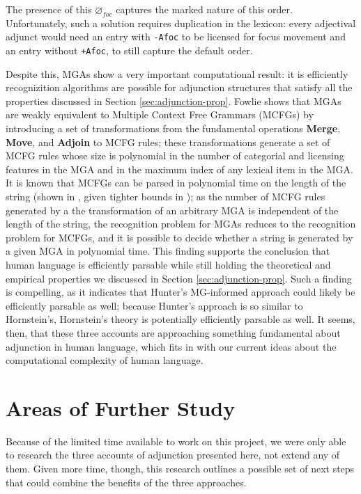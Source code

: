 \documentclass{article}
\begin{document}
The presence of this $\varnothing_{foc}$ captures the marked nature of
this order.  Unfortunately, such a solution requires duplication in
the lexicon: every adjectival adjunct would need an entry with
\texttt{-Afoc} to be licensed for focus movement and an entry without
\texttt{+Afoc}, to still capture the default order.

Despite this, MGAs show a very important computational result: it is
efficiently recognizition algorithms are possible for adjunction
structures that satisfy all the properties discussed in Section
\ref{sec:adjunction-prop}.  Fowlie shows that MGAs are weakly
equivalent to Multiple Context Free Grammars (MCFGs) \cite[Lemma
7.8.4]{fowlie2015} by introducing a set of transformations from the
fundamental operations \textbf{Merge}, \textbf{Move}, and
\textbf{Adjoin} to MCFG rules; these transformations generate a set of
MCFG rules whose size is polynomial in the number of categorial and
licensing features in the MGA and in the maximum index of any lexical
item in the MGA.  It is known that MCFGs can be parsed in polynomial
time on the length of the string (shown in \cite[Theorem
3.10]{seki1991}, given tighter bounds in \cite{nakanishi1997}); as the
number of MCFG rules generated by a the transformation of an arbitrary
MGA is independent of the length of the string, the recognition
problem for MGAs reduces to the recognition problem for MCFGs, and it
is possible to decide whether a string is generated by a given MGA in
polynomial time.  This finding supports the conclusion that human
language is efficiently parsable while still holding the theoretical
and empirical properties we discussed in Section
\ref{sec:adjunction-prop}.  Such a finding is compelling, as it
indicates that Hunter's MG-informed approach could likely be
efficiently parsable as well; because Hunter's approach is so similar
to Hornstein's, Hornstein's theory is potentially efficiently parsable
as well.  It seems, then, that these three accounts are approaching
something fundamental about adjunction in human language, which fits
in with our current ideas about the computational complexity of human
language.


\section{Areas of Further Study}
\label{sec:conclusion}

Because of the limited time available to work on this project, we were
only able to research the three accounts of adjunction presented here,
not extend any of them.  Given more time, though, this research
outlines a possible set of next steps that could combine the benefits
of the three approaches.
\end{document}
